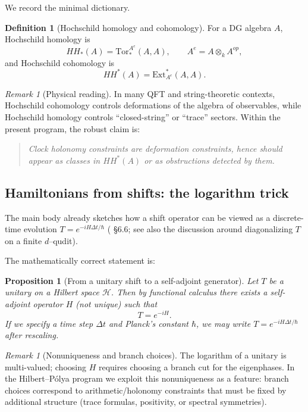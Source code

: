 \documentclass[11pt,oneside]{amsbook}
\numberwithin{equation}{section}
\theoremstyle{plain}
\newtheorem{proposition}[theorem]{Proposition}
\theoremstyle{definition}
\newtheorem{definition}[theorem]{Definition}
\theoremstyle{remark}
\newtheorem{remark}[theorem]{Remark}
\newcommand{\cH}{\mathcal{H}}
\begin{document}
We record the minimal dictionary.

\begin{definition}[Hochschild homology and cohomology]
For a DG algebra $A$, Hochschild homology is
\[
HH_*(A)=\mathrm{Tor}^{A^e}_*(A,A),\qquad A^e=A\otimes_k A^{op},
\]
and Hochschild cohomology is
\[
HH^*(A)=\mathrm{Ext}^{*}_{A^e}(A,A).
\]
\end{definition}

\begin{remark}[Physical reading]
In many QFT and string-theoretic contexts, Hochschild cohomology controls deformations of the algebra of observables, while Hochschild homology controls ``closed-string'' or ``trace'' sectors.
Within the present program, the robust claim is:
\begin{quote}
\emph{Clock holonomy constraints are deformation constraints, hence should appear as classes in $HH^*(A)$ or as obstructions detected by them.}
\end{quote}
\end{remark}

\subsection{Hamiltonians from shifts: the logarithm trick}
\label{sec:hamiltonian_log}

The  main body already sketches how a shift operator can be viewed as a discrete-time evolution $T=e^{-iH\Delta t/\hbar}$ ( \S6.6; see also the discussion around diagonalizing $T$ on a finite $d$--qudit).

The mathematically correct statement is:

\begin{proposition}[From a unitary shift to a self-adjoint generator]
Let $T$ be a unitary on a Hilbert space $\cH$.
Then by functional calculus there exists a self-adjoint operator $H$ (not unique) such that
\[
T = e^{-iH}.
\]
If we specify a time step $\Delta t$ and Planck's constant $\hbar$, we may write $T=e^{-iH\Delta t/\hbar}$ after rescaling.
\end{proposition}

\begin{remark}[Nonuniqueness and branch choices]
The logarithm of a unitary is multi-valued; choosing $H$ requires choosing a branch cut for the eigenphases.
In the Hilbert--Pólya program we exploit this nonuniqueness as a feature: branch choices correspond to arithmetic/holonomy constraints that must be fixed by additional structure (trace formulas, positivity, or spectral symmetries).
\end{remark}
\end{document}

